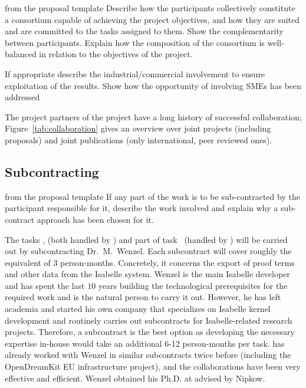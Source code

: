 \begin{todo}{from the proposal template}
  Describe how the participants collectively constitute a consortium capable of achieving
  the project objectives, and how they are suited and are committed to the tasks assigned
  to them. Show the complementarity between participants. Explain how the composition of
  the consortium is well-balanced in relation to the objectives of the project.

  If appropriate describe the industrial/commercial involvement to ensure exploitation of
  the results. Show how the opportunity of involving SMEs has been addressed
\end{todo}

The project partners of the \pn project have a long history of successful collaboration;
Figure~\ref{tab:collaboration} gives an overview over joint projects (including proposals) and
joint publications (only international, peer reviewed ones).

%



\coherencetable

\subsection{Subcontracting}\label{sec:subcontracting}

\begin{todo}{from the proposal template}
  If any part of the work is to be sub-contracted by the participant responsible for it,
  describe the work involved and explain why a sub-contract approach has been chosen for
  it.
\end{todo}

The tasks ,
 (both handled by ) and part of
task~ (handled by ) will
be carried out by subcontracting Dr.\ M.\ Wenzel.  Each subcontract
will cover roughly the equivalent of $3$ person-months.  Concretely,
it concerns the export of proof terms and other data from the Isabelle
system.  Wenzel is the main Isabelle developer and has spent the
last $10$ years building the technological prerequisites for the
required work and is the natural person to carry it out.  However, he
has left academia and started his own company that specializes on
Isabelle kernel development and routinely carries out subcontracts for
Isabelle-related research projects.  Therefore, a subcontract is the
best option as developing the necessary expertise in-house would take
an additional 6-12 person-months per task.   has already worked with
Wenzel in similar subcontracts twice before (including the
OpenDreamKit EU infrastructure project), and the collaborations have
been very effective and efficient. Wenzel obtained his Ph.D. at
 advised by Nipkow.

